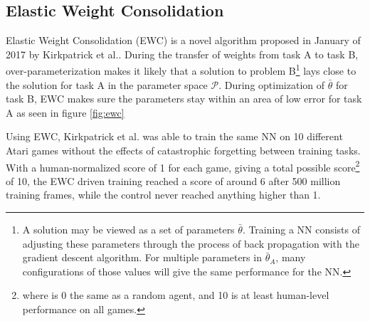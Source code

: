 \subsection{Elastic Weight Consolidation}
Elastic Weight Consolidation (EWC) is a novel algorithm proposed in January of 2017 by Kirkpatrick et al.\cite{ewc}. During the transfer of weights from task A to task B, over-parameterization makes it likely that a solution to problem B\footnote{A solution may be viewed as a set of parameters \(\bar{\theta}\). Training a NN consists of adjusting these parameters through the process of back propagation with the gradient descent algorithm. For multiple parameters in \(\bar{\theta}_{A}\), many configurations of those values will give the same performance for the NN.} lays close to the solution for task A in the parameter space \(\mathcal{P}\). During optimization of \(\bar{\theta}\) for task B, EWC makes sure the parameters stay within an area of low error for task A as seen in figure \ref{fig:ewc}

Using EWC, Kirkpatrick et al.\cite{ewc} was able to train the same NN on 10 different Atari games without the effects of catastrophic forgetting between training tasks. With a human-normalized score of 1 for each game, giving a total possible score\footnote{where is 0 the same as a random agent, and 10 is at least human-level performance on all games.} of 10, the EWC driven training reached a score of around 6 after 500 million training frames, while the control never reached anything higher than 1.

